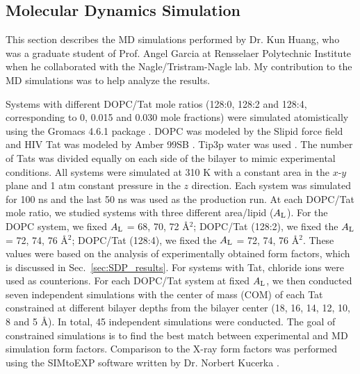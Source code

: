 \subsection{Molecular Dynamics Simulation}\label{sec:sim_methods}
This section describes the MD simulations performed by Dr. Kun Huang, who was
a graduate student of Prof. Angel Garcia at Rensselaer Polytechnic Institute
when he collaborated with the Nagle/Tristram-Nagle lab.
My contribution to the MD simulations was to help analyze the results.

Systems with different DOPC/Tat mole ratios (128:0, 128:2 and 128:4, corresponding to
0, 0.015 and 0.030 mole fractions) were simulated atomistically using the Gromacs 4.6.1
package \cite{Hess08}. 
DOPC was modeled by the Slipid force field 
\cite{Jambeck12_JPCB,Jambeck12_JCTC} 
and HIV Tat was modeled by Amber 99SB \cite{Hornak06}. 
Tip3p water was used \cite{Jorgensen83}. The number of Tats was divided equally on
each side of the bilayer to mimic experimental conditions. All systems were simulated at 310 K
with a constant area in the $x$-$y$ plane and 1 atm constant pressure in the $z$ direction. Each
system was simulated for 100 ns and the last 50 ns was used as the production run.
At each DOPC/Tat mole ratio, we studied systems with three different area/lipid ($A_\textrm{L}$).
For the DOPC system, we fixed $A_\textrm{L}$ = 68, 70, 72 \AA$^2$; 
DOPC/Tat (128:2), we fixed the $A_\textrm{L}$ = 72, 74, 76 \AA$^2$; 
DOPC/Tat (128:4), we fixed the $A_\textrm{L}$ = 72, 74, 76 \AA$^2$. 
These values were based on the analysis of experimentally obtained form 
factors, which is discussed in Sec.~\ref{sec:SDP_results}.
For systems with Tat, chloride ions were used as counterions.
For each DOPC/Tat system at fixed $A_\textrm{L}$, 
we then conducted seven independent simulations with the center of mass (COM) of
each Tat constrained at different bilayer depths from the bilayer center 
(18, 16, 14, 12, 10, 8 and 5 \AA). 
In total, 45 independent simulations were conducted. 
The goal of constrained simulations is to find the best match between 
experimental and MD simulation form factors. Comparison to
the X-ray form factors was performed using the SIMtoEXP software 
written by Dr. Norbert Kucerka \cite{Kucerka10}. 


